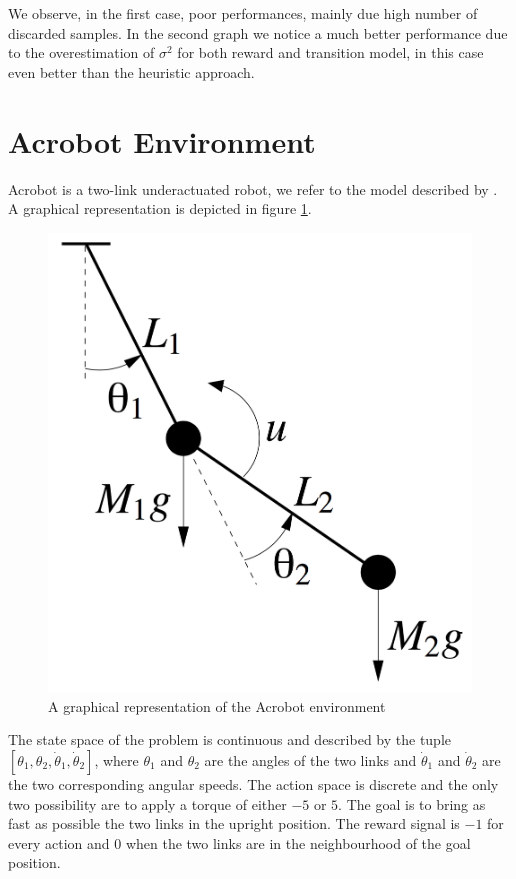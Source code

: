     \noindent We observe, in the first case, poor performances, mainly due high number of discarded samples.
    In the second graph we notice a much better performance due to the overestimation of $\sigma^{2}$ for
    both reward and transition model, in this case even better than the heuristic approach.

  \section{Acrobot Environment}
    \noindent Acrobot is a two-link underactuated robot, we refer to the model described by \cite{ernst2005tree}. A
    graphical representation is depicted in figure \ref{acrobot_fig}.

    \begin{figure}[H]
      \raggedbottom
      \centering
      \includegraphics[scale=0.3]{images/acrobot.png}
      \caption{A graphical representation of the Acrobot environment}
      \label{acrobot_fig}
    \end{figure}

    \noindent The state space of the problem is continuous and described by the
    tuple $[\theta_1, \theta_2, \dot{\theta}_1, \dot{\theta}_2]$, where $\theta_1$ and
    $\theta_2$ are the angles of the two links and $\dot{\theta}_1$ and $\dot{\theta}_2$
    are the two corresponding angular speeds. The action space is discrete and the only
    two possibility are to apply a torque of either $-5$ or $5$.\newline
    The goal is to bring as fast as possible the two links in the upright position.
    The reward signal is $-1$ for every action and $0$ when the two links are in the
    neighbourhood of the goal position.\newline

